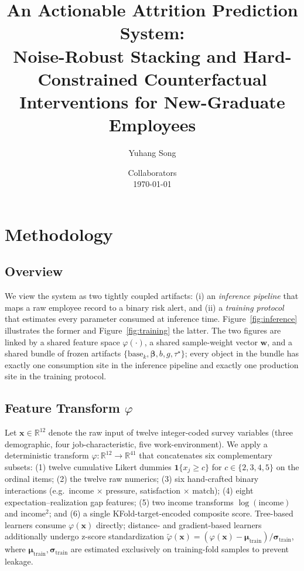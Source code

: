 \documentclass[11pt,a4paper]{article}
\title{An Actionable Attrition Prediction System:\\
Noise-Robust Stacking and Hard-Constrained Counterfactual\\
Interventions for New-Graduate Employees}
\author{Yuhang Song \and Collaborators \\ \small{\today}}
\date{}
\newcommand{\RR}{\mathbb{R}}
\newcommand{\taustar}{\tau^{\star}}
\begin{document}
\maketitle

\section{Methodology}
\label{sec:methods}

\subsection{Overview}
\label{sec:methods-overview}

We view the system as two tightly coupled artifacts: (i) an
\emph{inference pipeline} that maps a raw employee record to a binary
risk alert, and (ii) a \emph{training protocol} that estimates every
parameter consumed at inference time. Figure~\ref{fig:inference}
illustrates the former and Figure~\ref{fig:training} the latter. The two
figures are linked by a shared feature space $\varphi(\cdot)$, a shared
sample-weight vector $\mathbf{w}$, and a shared bundle of frozen
artifacts $\{\text{base}_k,\bm{\beta},b,g,\taustar\}$; every object in the
bundle has exactly one consumption site in the inference pipeline and
exactly one production site in the training protocol.

\subsection{Feature Transform \texorpdfstring{$\varphi$}{phi}}
\label{sec:methods-phi}

Let $\mathbf{x}\in\RR^{12}$ denote the raw input of twelve integer-coded
survey variables (three demographic, four job-characteristic, five
work-environment). We apply a deterministic
transform $\varphi:\RR^{12}\to\RR^{41}$ that concatenates six
complementary subsets: (1) twelve cumulative Likert dummies
$\mathbf{1}\{x_j\ge c\}$ for $c\in\{2,3,4,5\}$ on the ordinal items;
(2) the twelve raw numerics; (3) six hand-crafted binary interactions
(e.g.\ income $\times$ pressure, satisfaction $\times$ match);
(4) eight expectation--realization gap features;
(5) two income transforms $\log(\text{income})$ and $\text{income}^2$;
and (6) a single KFold-target-encoded composite score. Tree-based learners
consume $\varphi(\mathbf{x})$ directly; distance- and gradient-based
learners additionally undergo z-score standardization
$\tilde{\varphi}(\mathbf{x}) = (\varphi(\mathbf{x}) - \bm{\mu}_{\mathrm{train}})/
\bm{\sigma}_{\mathrm{train}}$, where
$\bm{\mu}_{\mathrm{train}},\bm{\sigma}_{\mathrm{train}}$ are estimated
exclusively on training-fold samples to prevent leakage.
\end{document}

